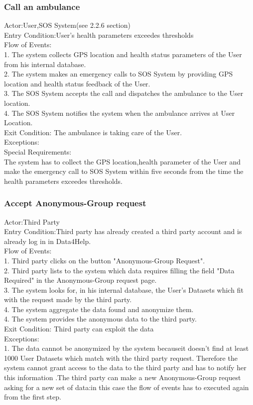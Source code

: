 \subsubsection{Call an ambulance}
Actor:User,SOS System(see 2.2.6 section)\\
Entry Condition:User's health parameters exceedes thresholds\\
Flow of Events:\\
1. The system collects GPS location and health status parameters of the User from his internal database.\\
2. The system makes an emergency calls to SOS System by providing GPS location and health status feedback of the User.\\
3. The SOS System accepts the call and dispatches the ambulance to the User location.\\
4. The SOS System notifies the system when the ambulance arrives at User Location.\\
Exit Condition: The ambulance is taking care of the User. \\
Exceptions:\\
Special Requirements:\\
The system has to collect the GPS location,health parameter of the User and make the emergency call to SOS System within five seconds from the time the health parameters exceedes thresholds.\\

\subsubsection{Accept Anonymous-Group request}
Actor:Third Party\\
Entry Condition:Third party has already created a third party account and is already log in in Data4Help.\\
Flow of Events:\\
1. Third party clicks on the button "Anonymous-Group Request".\\
2. Third party lists to the system which data requires filling the field "Data Required" in the Anonymous-Group request page.\\
3. The system looks for, in his internal database, the User's Datasets  which fit with the request made by the third party.\\
4. The system aggregate the data found and anonymize them. \\
4. The system provides the anonymous data to the third party.\\
Exit Condition: Third party can exploit the data \\
Exceptions:\\
1. The data cannot be anonymized  by the system becauseit doesn't find at least 1000 User Datasets which match with the third party request. Therefore the system cannot grant access to the data to the third party and has to notify her this information .The third party can make a new Anonymous-Group request asking for a new set of data:in this case the flow of events has to executed again from the first step.\\

